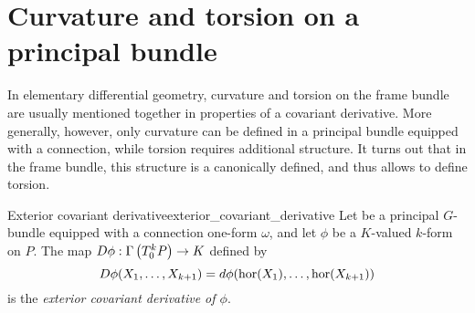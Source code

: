 \section{Curvature and torsion on a principal bundle}
In elementary differential geometry, curvature and torsion on the frame bundle are usually mentioned together in properties of a covariant derivative. More generally, however, only curvature can be defined in a principal bundle equipped with a connection, while torsion requires additional structure. It turns out that in the frame bundle, this structure is a canonically defined, and thus allows to define torsion.

\begin{definition}{Exterior covariant derivative}{exterior_covariant_derivative}
    Let  be a principal \(G\)-bundle equipped with a connection one-form \(\omega\), and let \(\phi\) be a \(K\)-valued \(k\)-form on \(P\). The map \(D \phi : \Gamma\left(T_0^k P\right) \to K\) defined by
    \begin{equation*}
        D\phi(X_1, \dots, X_{k+1}) = d\phi(\operatorname{hor}(X_1), \dots, \operatorname{hor}(X_{k+1}))
    \end{equation*}
    is the \emph{exterior covariant derivative of \(\phi\)}.
\end{definition}

